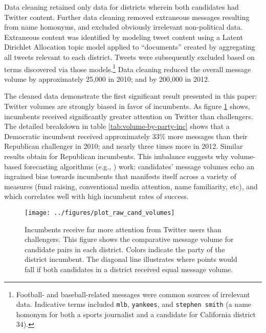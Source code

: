 \documentclass{acm_proc_article-sp}
\begin{document}
Data cleaning retained only
data for districts wherein both candidates had Twitter
content. Further data cleaning removed extraneous messages resulting
from name homonyms, and excluded obviously irrelevant non-political
data. Extraneous content was identified by modeling tweet content
using a Latent Dirichlet Allocation topic model applied to
``documents'' created by aggregating all tweets relevant to each
district. Tweets were subsequently excluded based on terms discovered
via those models.\footnote{Football- and baseball-related messages were
  common sources of irrelevant data. Indicative terms included
  \texttt{mlb}, \texttt{yankees}, and \texttt{stephen smith} (a name
  homonym for both a sports journalist and a candidate for California
  district 34).} Data cleaning reduced the overall message volume
by approximately 25,000 in 2010; and by 200,000 in 2012.

The cleaned data demonstrate the first significant result presented in
this paper: Twitter volumes are strongly biased in favor of
incumbents. As figure \ref{fig:cand-msg-volume} shows, incumbents
received significantly greater attention on Twitter than challengers.
The detailed breakdown in table \ref{tab:volume-by-party-inc} shows
that a Democratic incumbent received approximately 33\% more messages
than their Republican challenger in 2010; and nearly three times more
in 2012. Similar results obtain for Republican incumbents. This
imbalance suggests why volume-based forecasting algorithms (e.g.,
\cite{digrazia2013,tumasjan2010election,bermingham2011using}) work:
candidates' message volumes echo an ingrained bias towards incumbents
that manifests itself across a variety of measures (fund raising,
conventional media attention, name familiarity, etc), and which
correlates well with high incumbent rates of success. 


\begin{figure}[ht]
  \centering
  \texttt{[image: ../figures/plot\_raw\_cand\_volumes]}
  \caption{Incumbents receive far more attention from Twitter users
    than challengers. This figure shows the comparative message volume for
    candidate pairs in each district. Colors indicate the party of the
    district incumbent. The diagonal line illustrates where points would fall if both candidates in a district received equal message volume.}
  \label{fig:cand-msg-volume}
\end{figure}
\end{document}
